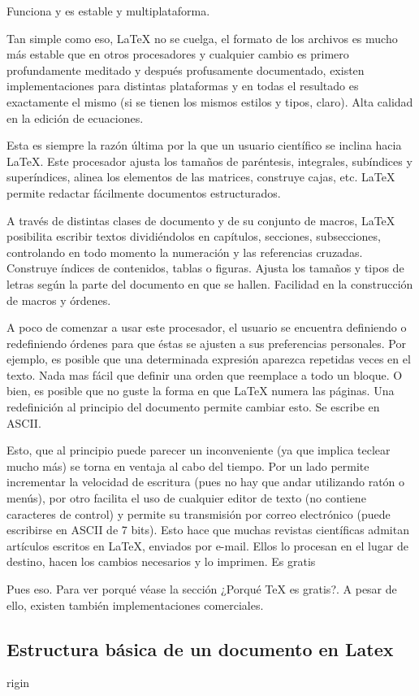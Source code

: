 \documentclass[11pt,letterpaper]{article}
\begin{document}
Funciona y es estable y multiplataforma.

    Tan simple como eso, LaTeX no se cuelga, el formato de los archivos es mucho más estable que en otros procesadores y cualquier cambio es primero profundamente meditado y después profusamente documentado, existen implementaciones para distintas plataformas y en todas el resultado es exactamente el mismo (si se tienen los mismos estilos y tipos, claro).
Alta calidad en la edición de ecuaciones.

    Esta es siempre la razón última por la que un usuario científico se inclina hacia LaTeX. Este procesador ajusta los tamaños de paréntesis, integrales, subíndices y superíndices, alinea los elementos de las matrices, construye cajas, etc.
LaTeX permite redactar fácilmente documentos estructurados.

    A través de distintas clases de documento y de su conjunto de macros, LaTeX posibilita escribir textos dividiéndolos en capítulos, secciones, subsecciones, controlando en todo momento la numeración y las referencias cruzadas. Construye índices de contenidos, tablas o figuras. Ajusta los tamaños y tipos de letras según la parte del documento en que se hallen.
Facilidad en la construcción de macros y órdenes.

    A poco de comenzar a usar este procesador, el usuario se encuentra definiendo o redefiniendo órdenes para que éstas se ajusten a sus preferencias personales. Por ejemplo, es posible que una determinada expresión aparezca repetidas veces en el texto. Nada mas fácil que definir una orden que reemplace a todo un bloque. O bien, es posible que no guste la forma en que LaTeX numera las páginas. Una redefinición al principio del documento permite cambiar esto.
Se escribe en ASCII.

    Esto, que al principio puede parecer un inconveniente (ya que implica teclear mucho más) se torna en ventaja al cabo del tiempo. Por un lado permite incrementar la velocidad de escritura (pues no hay que andar utilizando ratón o menús), por otro facilita el uso de cualquier editor de texto (no contiene caracteres de control) y permite su transmisión por correo electrónico (puede escribirse en ASCII de 7 bits). Esto hace que muchas revistas científicas admitan artículos escritos en LaTeX, enviados por e-mail. Ellos lo procesan en el lugar de destino, hacen los cambios necesarios y lo imprimen.
Es gratis

    Pues eso. Para ver porqué véase la sección ¿Porqué TeX es gratis?. A pesar de ello, existen también implementaciones comerciales.

\subsection{Estructura básica de un documento en Latex}rigin
\end{document}
